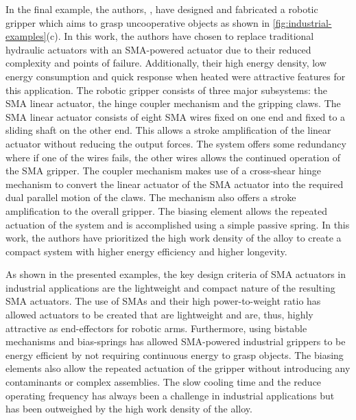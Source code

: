 In the final example, the authors, \cite{luNovelDesignParallel2019}, have designed and fabricated a robotic gripper which aims to grasp uncooperative objects as shown in \cref{fig:industrial-examples}(c). In this work, the authors have chosen to replace traditional hydraulic actuators with an SMA-powered actuator due to their reduced complexity and points of failure. Additionally, their high energy density, low energy consumption and quick response when heated were attractive features for this application. The robotic gripper consists of three major subsystems: the SMA linear actuator, the hinge coupler mechanism and the gripping claws. The SMA linear actuator consists of eight SMA wires fixed on one end and fixed to a sliding shaft on the other end. This allows a stroke amplification of the linear actuator without reducing the output forces. The system offers some redundancy where if one of the wires fails, the other wires allows the continued operation of the SMA gripper. The coupler mechanism makes use of a cross-shear hinge mechanism to convert the linear actuator of the SMA actuator into the required dual parallel motion of the claws. The mechanism also offers a stroke amplification to the overall gripper. The biasing element allows the repeated actuation of the system and is accomplished using a simple passive spring. In this work, the authors have prioritized the high work density of the alloy to create a compact system with higher energy efficiency and higher longevity.

As shown in the presented examples, the key design criteria of SMA actuators in industrial applications are the lightweight and compact nature of the resulting SMA actuators. The use of SMAs and their high power-to-weight ratio has allowed actuators to be created that are lightweight and are, thus, highly attractive as end-effectors for robotic arms. Furthermore, using bistable mechanisms and bias-springs has allowed SMA-powered industrial grippers to be energy efficient by not requiring continuous energy to grasp objects. The biasing elements also allow the repeated actuation of the gripper without introducing any contaminants or complex assemblies. The slow cooling time and the reduce operating frequency has always been a challenge in industrial applications but has been outweighed by the high work density of the alloy.

